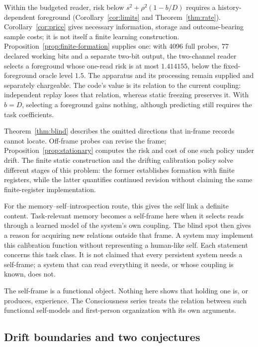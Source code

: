 \documentclass[12pt]{article}
\theoremstyle{definition}
\begin{document}
Within the budgeted reader, risk below $s^2+\rho^2(1-b/D)$
requires a history-dependent foreground (Corollary~\ref{cor:limits}
and Theorem~\ref{thm:rate}).
Corollary~\ref{cor:price} gives necessary information, storage and
outcome-bearing sample costs; it is not itself a finite learning
construction. Proposition~\ref{prop:finite-formation} supplies one:
with 4096 full probes, 77 declared working bits and a separate
two-bit output, the two-channel reader selects a foreground whose
one-read risk is at most $1.414155$, below the fixed-foreground oracle
level $1.5$. The apparatus and its processing remain supplied and
separately chargeable. The code's value is its relation to the current
coupling: independent replay loses that relation, whereas static
freezing preserves it. With $b=D$, selecting a foreground gains
nothing, although predicting still requires the task coefficients.

Theorem~\ref{thm:blind} describes the omitted directions that in-frame
records cannot locate. Off-frame probes can revise the frame;
Proposition~\ref{prop:stationary} computes the risk and cost of one
such policy under drift. The finite static construction and the
drifting calibration policy solve different stages of this problem:
the former establishes formation with finite registers, while the
latter quantifies continued revision without claiming the same
finite-register implementation.

For the memory--self--introspection route, this gives the self link a definite content. Task-relevant memory becomes a self-frame here when it selects reads through a learned model of the system's own coupling. The blind spot then gives a reason for acquiring new relations outside that frame. A system may implement this calibration function without representing a human-like self. Each statement concerns this task class. It is not claimed that every persistent system needs a self-frame; a system that can read everything it needs, or whose coupling is known, does not.

The self-frame is a functional object. Nothing here shows that holding one is, or produces, experience. The Consciousness series treats the relation between such functional self-models and first-person organization with its own arguments.

\subsection{Drift boundaries and two conjectures}
\end{document}
